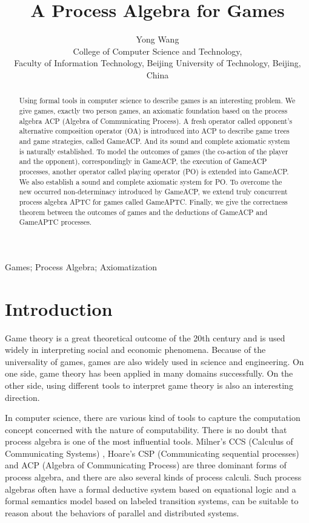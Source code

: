 \documentclass{fac}
\title[A Process Algebra for Games]
      {A Process Algebra for Games}
\author[Yong Wang]
    {Yong Wang\\
     College of Computer Science and Technology,\\
     Faculty of Information Technology,
     Beijing University of Technology, Beijing, China\\
     }
\begin{document}
\label{firstpage}

\makecorrespond

\maketitle

\begin{abstract}
Using formal tools in computer science to describe games is an interesting problem. We give games, exactly two person games, an axiomatic foundation based on the process algebra ACP (Algebra of Communicating Process). A fresh operator called opponent's alternative composition operator (OA) is introduced into ACP to describe game trees and game strategies, called GameACP. And its sound and complete axiomatic system is naturally established. To model the outcomes of games (the co-action of the player and the opponent), correspondingly in GameACP, the execution of GameACP processes, another operator called playing operator (PO) is extended into GameACP. We also establish a sound and complete axiomatic system for PO. To overcome the new occurred non-determinacy introduced by GameACP, we extend truly concurrent process algebra APTC for games called GameAPTC. Finally, we give the correctness theorem between the outcomes of games and the deductions of GameACP and GameAPTC processes.
\end{abstract}

\begin{keywords}
Games; Process Algebra; Axiomatization
\end{keywords}

\section{Introduction}

Game theory \cite{Games} is a great theoretical outcome of the 20th century and is used widely in interpreting social and economic phenomena. Because of the universality of games, games are also widely used in science and engineering. On one side, game theory has been applied in many domains successfully. On the other side, using different tools to interpret game theory is also an interesting direction.

In computer science, there are various kind of tools to capture the computation concept concerned with the nature of computability. There is no doubt that process algebra \cite{PA} is one of the most influential tools. Milner's CCS (Calculus of Communicating Systems) \cite{CCS}, Hoare's CSP (Communicating sequential processes) \cite{CSP} and ACP (Algebra of Communicating Process) \cite{ACP} are three dominant forms of process algebra, and there are also several kinds of process calculi. Such process algebras often have a formal deductive system based on equational logic and a formal semantics model based on labeled transition systems, can be suitable to reason about the behaviors of parallel and distributed systems.
\end{document}
